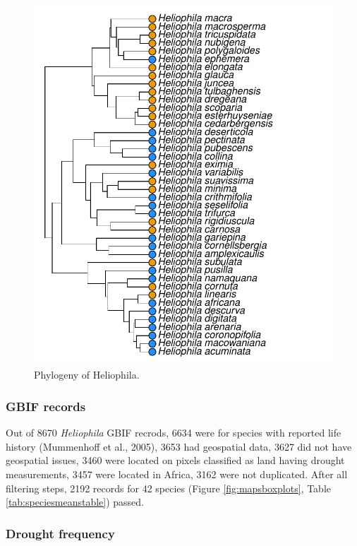 \documentclass[man,floatsintext]{apa6}
\theoremstyle{definition}
\theoremstyle{definition}
\theoremstyle{definition}
\theoremstyle{remark}
\begin{document}
\begin{figure}[!h]
\includegraphics[width=\textwidth]{../figures/phylogeny} \caption{Phylogeny of Heliophila.}\label{fig:phylogeny}
\end{figure}

\hypertarget{gbif-records}{%
\subsubsection{GBIF records}\label{gbif-records}}

Out of 8670 \emph{Heliophila} GBIF recrods, 6634 were for species with
reported life history (Mummenhoff et al., 2005), 3653 had geospatial
data, 3627 did not have geospatial issues, 3460 were located on pixels
classified as land having drought measurements, 3457 were located in
Africa, 3162 were not duplicated. After all filtering steps, 2192
records for 42 species (Figure \ref{fig:mapsboxplots}, Table
\ref{tab:speciesmeanstable}) passed.

\hypertarget{drought-frequency}{%
\subsubsection{Drought frequency}\label{drought-frequency}}
\end{document}
